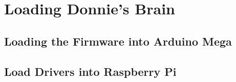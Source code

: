 \chapter{Loading Donnie's Brain}

\section{Loading the Firmware into Arduino Mega}
\label{sec:load_mega}

\section{Load Drivers into Raspberry Pi}
\label{sec:load_pri}

